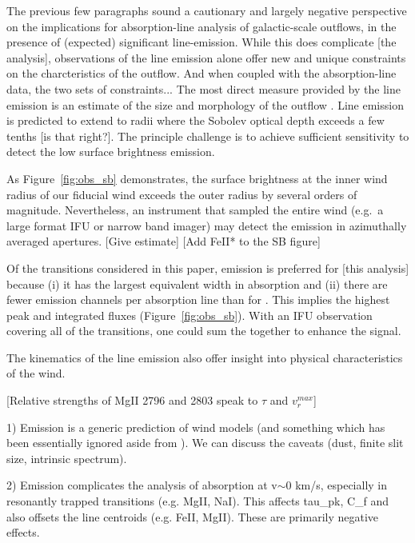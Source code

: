 \documentclass[12pt,preprint]{aastex}
\begin{document}
The previous few paragraphs sound a cautionary and largely negative
perspective on the implications for absorption-line analysis of
galactic-scale outflows, in the presence of (expected) significant
line-emission.   While this does complicate [the analysis],
observations of the line emission alone offer new and unique
constraints on the charcteristics of the outflow.  And when coupled
with the absorption-line data, the two sets of constraints...
The most direct measure provided by the line emission is an estimate
of the size and morphology of the outflow \citep[e.g.][]{rubin+10c}.  
Line emission is predicted to extend to radii where the Sobolev
optical depth exceeds a few tenths [is that right?].  The principle
challenge is to achieve sufficient sensitivity to detect the low
surface brightness emission.  

As Figure~\ref{fig:obs_sb}
demonstrates, the surface brightness at the inner wind radius of our
fiducial wind exceeds the outer radius by several orders of magnitude.
Nevertheless, an instrument that sampled the entire wind (e.g.\ a
large format IFU or narrow band imager) may detect the emission in
azimuthally averaged apertures. [Give estimate]
[Add FeII* to the SB figure]

Of the transitions considered in this paper,  emission is
preferred for [this analysis] because 
(i) it has the largest equivalent width in absorption and
(ii) there are fewer emission channels per absorption line than for
.  This implies the highest peak and integrated fluxes
(Figure~\ref{fig:obs_sb}).  With an IFU observation covering all of
the  transitions, one could sum the together to enhance the
signal. 

The kinematics of the line emission also offer insight into physical
characteristics of the wind.

[Relative strengths of MgII 2796 and 2803 speak to $\tau$ and
$v_r^{max}$]


1)  Emission is a generic prediction of wind models (and something
which has been essentially ignored aside from \lya).  We can discuss
the caveats (dust, finite slit size, intrinsic spectrum).

2)  Emission complicates the analysis of absorption at v$\sim$0 km/s, especially in
resonantly trapped transitions (e.g. MgII, NaI).   This affects tau\_pk,
C\_f and also offsets the line centroids (e.g. FeII, MgII).  These
are primarily negative effects.
\end{document}
